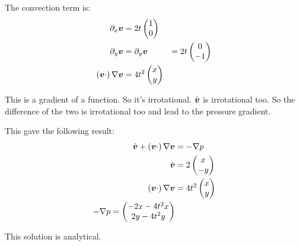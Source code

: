 The convection term is:
\begin{align}
	\partial_{x}{\boldsymbol {v}}&=2t\begin{pmatrix}
	                        	1\\
	                        	0
	                        \end{pmatrix}\\
	\partial_{y}{\boldsymbol {v}}&=\partial_{y}{\boldsymbol {v}}&=2t\begin{pmatrix}
	                        	0\\
	                        	-1
	                        \end{pmatrix}\\
 \left({\boldsymbol {v}}\cdot\right) \nabla {\boldsymbol {v}}&=4t^2\begin{pmatrix}
                                                 	x\\
                                                 	y
                                                 \end{pmatrix}
\end{align}

This is a gradient of a function. So it's irrotational. $\dot{{\boldsymbol {v}}}$ is irrotational too.
So the difference of the two is irrotational too and lead to the pressure gradient.

This gave the following result:
\begin{align}
\dot{{\boldsymbol {v}}}+ \left({\boldsymbol {v}}\cdot\right) \nabla {\boldsymbol {v}}&=-\nabla p\\
\dot{{\boldsymbol {v}}}&=2\begin{pmatrix}
	               	x\\
	               	-y
	               \end{pmatrix}\\
\left({\boldsymbol {v}}\cdot\right) \nabla {\boldsymbol {v}}&=4t^2\begin{pmatrix}
                                                 	x\\
                                                 	y
                                                 \end{pmatrix}\\
-\nabla p=\begin{pmatrix}
           -2x-4t^2x\\
           2y-4t^2y
           \end{pmatrix}\\
\end{align}

This solution is analytical.

